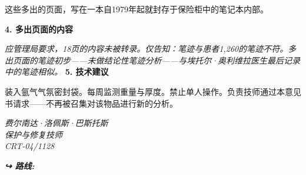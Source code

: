 \noindent 这些多出的页面，写在一本自1979年起就封存于保险柜中的笔记本内部。

\noindent \textbf{4. 多出页面的内容}

\noindent \textit{应管理局要求，18页的内容未被转录。仅告知：笔迹与患者1,260的笔迹不符。多出页面的笔迹初步——未做结论性笔迹分析——与埃托尔·奥利维拉医生最后记录中的笔迹相似。}
\noindent \textbf{5. 技术建议}

\noindent 装入氩气气氛密封袋。每周监测重量与厚度。禁止单人操作。负责技师通过本意见书请求——不再被召集对该物品进行新的分析。

\noindent \textit{费尔南达·洛佩斯·巴斯托斯}\\
\noindent \textit{保护与修复技师}\\
\noindent \textit{CRT-04/1128}

\vspace{0.5em}
\noindent\textit{\textbf{↪ 路线:}  \rotasep {} \rotasep {}}

